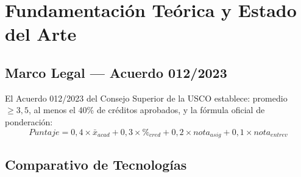 \documentclass[12pt,a4paper,twoside]{report}
\begin{document}
\chapter{Fundamentación Teórica y Estado del Arte}

\section{Marco Legal — Acuerdo 012/2023}
El Acuerdo 012/2023 del Consejo Superior de la USCO establece: promedio $\geq 3{,}5$, al menos el
40\% de créditos aprobados, y la fórmula oficial de ponderación:
\begin{equation}
Puntaje = 0{,}4 \times \bar{x}_{acad} + 0{,}3 \times \%_{cred} + 0{,}2 \times nota_{asig} + 0{,}1 \times nota_{entrev}
\end{equation}

\section{Comparativo de Tecnologías}
\end{document}
